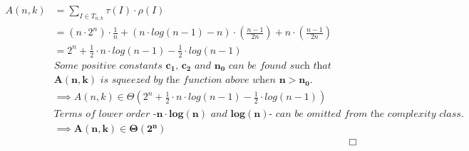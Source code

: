\documentclass{article}
\begin{document}
\begin{align*}
A(n,k) &= \displaystyle\sum _{I \in T_{n,k}} \tau (I) \cdot \rho (I) &&\\
 &= (n \cdot 2^{n}) \cdot \frac{1}{n} + (n \cdot log(n-1) - n) \cdot \left( \frac{n-1}{2n}\right) + n \cdot \left(\frac{n-1}{2n}\right) && \\
 &= 2^{n} + \frac{1}{2} \cdot n \cdot log(n - 1) - \frac{1}{2} \cdot log(n - 1) && \\ 
 &\textit{Some positive constants $\mathbf{c_{1}}$, $\mathbf{c_{2}}$ and $\mathbf{n_{0}}$ can be found such that} && \\ 
 &\textit{$\mathbf{A(n,k)}$ is squeezed by the function above when $\mathbf{n > n_{0}}$.} && \\
 &\implies A(n,k) \in \Theta (2^{n} + \frac{1}{2} \cdot n \cdot log(n - 1) - \frac{1}{2} \cdot log(n - 1)) && \\
 &\textit{Terms of lower order -$\mathbf{n \cdot log (n)}$ and $\mathbf{log (n)}$- can be omitted from the complexity class.} && \\
 &\implies \mathbf{A(n,k) \boldsymbol{\in} \Theta (2^{n})} && \\
 & &&\Box
\end{align*}
\end{document}
